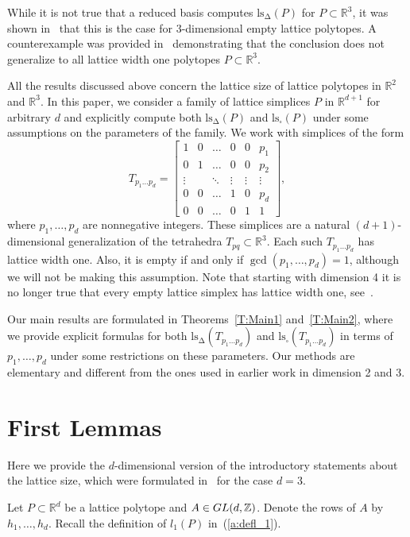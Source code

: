 \documentclass[11pt]{amsart}
\numberwithin{equation}{section}
\theoremstyle{plain}
\theoremstyle{definition}
\newcommand{\Z}{\mathbb Z}
\newcommand{\R}{\mathbb R}
\newcommand{\ls}{\operatorname{ls_\Delta}}
\newcommand{\lss}{\operatorname{ls_\square}}
\begin{document}
While it is not true that a reduced basis computes $\ls(P)$ for $P\subset\R^3$, it was shown in~\cite{AlajmiSopr} that this is the case for 3-dimensional empty lattice polytopes. A counterexample was provided in~\cite{AlajmiSopr}  demonstrating that the conclusion does not generalize to all lattice width one polytopes 
$P\subset\R^3$.

All the results discussed above concern the lattice size of lattice polytopes in $\R^2$ and $\R^3$. In this paper, we consider a family of lattice simplices $P$ in 
$\R^{d+1}$ for arbitrary $d$ and explicitly compute both $\ls(P)$ and $\lss(P)$ under some assumptions on the parameters of the family. We work with simplices of the form 
$$T_{p_1\dots p_d}=\begin{bmatrix}
1&0&\dots&0&0&p_1\\
0&1&\dots&0&0&p_2\\
\vdots&  &\ddots&\vdots&\vdots&\vdots\\
0&0&\dots&1&0&p_d\\
0&0&\dots&0&1&1
\end{bmatrix},
$$
where $p_1,\dots, p_d$ are nonnegative integers. These simplices are a natural $(d+1)$-dimensional generalization of the tetrahedra $T_{pq}\subset\R^3$. Each such $T_{p_1\dots p_d}$ has lattice width one. Also, it is empty if and only if
$\gcd(p_1,\dots,p_d)=1$, although we will not be making this assumption. Note that starting with dimension 4  it is no longer true that every empty lattice simplex has lattice width one, see~\cite{HaaseZieg}.

Our main results are formulated in Theorems~\ref{T:Main1} and~\ref{T:Main2}, where we provide explicit formulas for both $\ls(T_{p_1\dots p_d})$ and  $\lss(T_{p_1\dots p_d})$ in terms of $p_1,\dots, p_d$ under some restrictions on these parameters. Our methods are elementary and different from the ones used in earlier work in dimension 2 and 3.


\section{First Lemmas}
Here we provide the $d$-dimensional version of the introductory statements about the lattice size, which were formulated in~\cite{AlajmiSopr} for the case $d=3$.

Let $P\subset\R^d$ be a lattice polytope and $A\in{\rm GL}(d,\Z)$. Denote the rows of $A$ by $h_1,\dots, h_d$. Recall the definition of $l_1(P)$ in~(\ref{a:defl_1}).
\end{document}

